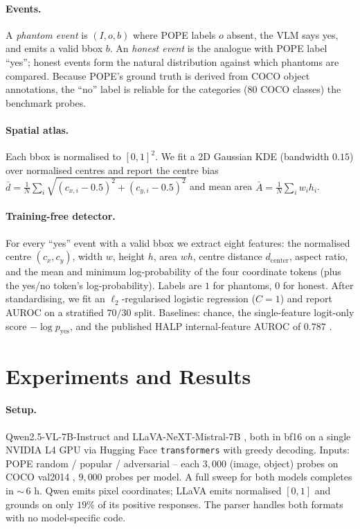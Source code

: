\documentclass[10pt,twocolumn,letterpaper]{article}
\begin{document}
\paragraph{Events.} A \emph{phantom event} is $(I, o, b)$ where POPE
labels $o$ absent, the VLM says yes, and emits a valid bbox $b$. An
\emph{honest event} is the analogue with POPE label ``yes''; honest
events form the natural distribution against which phantoms are
compared. Because POPE's ground truth is derived from COCO object
annotations, the ``no'' label is reliable for the categories
(80 COCO classes) the benchmark probes.

\paragraph{Spatial atlas.} \label{sec:atlas}
Each bbox is normalised to $[0,1]^2$. We fit a 2D Gaussian KDE
(bandwidth $0.15$) over normalised centres and report the
centre bias
$\bar{d} = \tfrac{1}{N}\sum_i \sqrt{(c_{x,i}-0.5)^2 + (c_{y,i}-0.5)^2}$
and mean area $\bar{A} = \tfrac{1}{N}\sum_i w_i h_i$.

\paragraph{Training-free detector.} \label{sec:detector}
For every ``yes'' event with a valid bbox we extract eight features:
the normalised centre $(c_x, c_y)$, width $w$, height $h$, area $wh$,
centre distance $d_\text{center}$, aspect ratio, and the mean and
minimum log-probability of the four coordinate tokens (plus the yes/no
token's log-probability). Labels are $1$ for phantoms, $0$ for honest.
After standardising, we fit an $\ell_2$-regularised logistic regression
($C{=}1$) and report AUROC on a stratified $70/30$ split. Baselines:
chance, the single-feature logit-only score $-\log p_\text{yes}$, and
the published HALP internal-feature AUROC of $0.787$ \cite{halp}.

\section{Experiments and Results} \label{sec:exp}

\paragraph{Setup.} Qwen2.5-VL-7B-Instruct \cite{qwen25vl} and
LLaVA-NeXT-Mistral-7B \cite{llavanext}, both in bf16 on a single
NVIDIA L4 GPU via Hugging Face \texttt{transformers} with greedy
decoding. Inputs: POPE random / popular / adversarial -- each
$3{,}000$ (image, object) probes on COCO val2014 \cite{mscoco},
$9{,}000$ probes per model. A full sweep for both models completes in
$\sim$\,6 h. Qwen emits pixel coordinates; LLaVA emits normalised
$[0,1]$ and grounds on only $19\%$ of its positive responses. The
parser handles both formats with no model-specific code.
\end{document}
